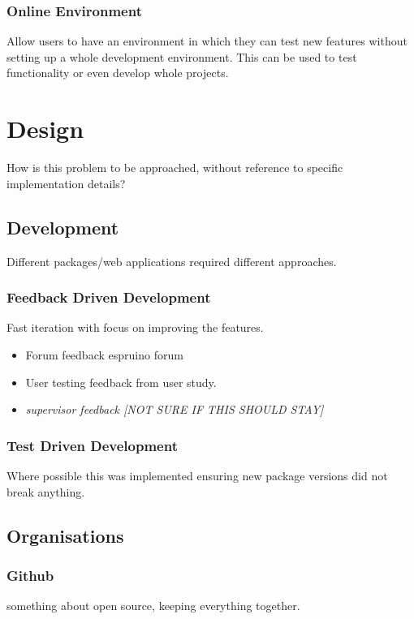 \documentclass{l4proj}
\begin{document}
\subsection{Online Environment}
\text Allow users to have an environment in which they can test new features without setting up a whole development environment. This can be used to test functionality or even develop whole projects.
\chapter{Design}
How is this problem to be approached, without reference to specific implementation details? 

\section{Development}

Different packages/web applications required different approaches.

\subsection{Feedback Driven Development}
Fast iteration with focus on improving the features.
\begin{itemize}
    \item Forum feedback espruino forum
    
    \item User testing feedback from user study.
    \item \textit{supervisor feedback [NOT SURE IF THIS SHOULD STAY]}
\end{itemize}

\subsection{Test Driven Development}
Where possible this was implemented ensuring new package versions did not break anything.

\section{Organisations}
\subsection{Github}
\text something about open source, keeping everything together.
\end{document}

